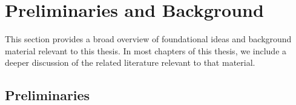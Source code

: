 \chapter{Preliminaries and Background}
This section provides a broad overview of foundational ideas
and background material relevant to this thesis.
In most chapters of this thesis, we include a deeper
discussion of the related literature relevant to
that material.

\section{Preliminaries}


